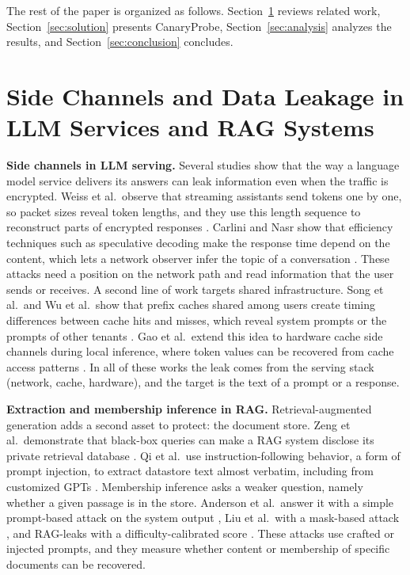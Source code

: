 \documentclass[conference]{IEEEtran}
\begin{document}
The rest of the paper is organized as follows. Section~\ref{sec:related} reviews related work, Section~\ref{sec:solution} presents CanaryProbe, Section~\ref{sec:analysis} analyzes the results, and Section~\ref{sec:conclusion} concludes.

\section{Side Channels and Data Leakage in LLM Services and RAG Systems}
\label{sec:related}

\textbf{Side channels in LLM serving.} Several studies show that the way a language model service delivers its answers can leak information even when the traffic is encrypted. Weiss et al.\ observe that streaming assistants send tokens one by one, so packet sizes reveal token lengths, and they use this length sequence to reconstruct parts of encrypted responses \cite{weiss24}. Carlini and Nasr show that efficiency techniques such as speculative decoding make the response time depend on the content, which lets a network observer infer the topic of a conversation \cite{carlini24}. These attacks need a position on the network path and read information that the user sends or receives. A second line of work targets shared infrastructure. Song et al.\ and Wu et al.\ show that prefix caches shared among users create timing differences between cache hits and misses, which reveal system prompts or the prompts of other tenants \cite{song25,wu25}. Gao et al.\ extend this idea to hardware cache side channels during local inference, where token values can be recovered from cache access patterns \cite{gao25}. In all of these works the leak comes from the serving stack (network, cache, hardware), and the target is the text of a prompt or a response.

\textbf{Extraction and membership inference in RAG.} Retrieval-augmented generation adds a second asset to protect: the document store. Zeng et al.\ demonstrate that black-box queries can make a RAG system disclose its private retrieval database \cite{zeng24}. Qi et al.\ use instruction-following behavior, a form of prompt injection, to extract datastore text almost verbatim, including from customized GPTs \cite{qi25}. Membership inference asks a weaker question, namely whether a given passage is in the store. Anderson et al.\ answer it with a simple prompt-based attack on the system output \cite{anderson24}, Liu et al.\ with a mask-based attack \cite{liu25}, and RAG-leaks with a difficulty-calibrated score \cite{raggleaks25}. These attacks use crafted or injected prompts, and they measure whether content or membership of specific documents can be recovered.
\end{document}
